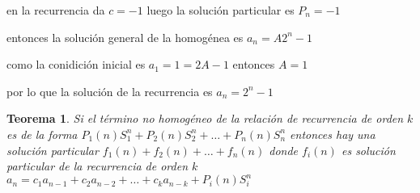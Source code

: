 \documentclass[a4paper,12pt]{report}
\newtheorem*{teo}{Teorema}
\begin{document}
en la recurrencia da $c=-1$ luego la solución particular es $P_n=-1$

entonces la solución general de la homogénea es $a_n=A2^n-1$

como la conidición inicial es $a_1=1=2A-1$ entonces $A=1$

por lo que la solución de la recurrencia es $a_n=2^n-1$


\begin{teo}
 Si el término no homogéneo de la relación de recurrencia de orden $k$ es de la forma $P_1(n)S^n_1+P_2(n)S^n_2+\dots+P_n(n)S^n_n$ entonces hay una solución particular $f_1(n)+f_2(n)+\dots+f_n(n)$ donde $f_i(n)$ es solución particular de la recurrencia de orden $k$  $a_n=c_1a_{n-1}+c_2a_{n-2}+\dots+c_ka_{n-k}+P_i(n)S^n_i$
\end{teo}



 








 
 
\end{document}
